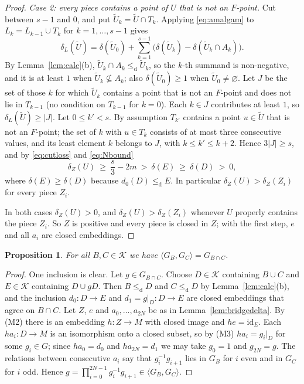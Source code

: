 \documentclass[11pt,a4paper]{article}
\newtheorem{proposition}[theorem]{Proposition}
\theoremstyle{definition}
\newcommand{\cle}{\leq_{\mathrm{d}}}
\newcommand{\id}{\mathrm{id}}
\newcommand{\K}{\mathcal{K}}
\begin{document}
\begin{proof}
\emph{Case 2: every piece contains a point of $U$ that is not an $F$-point.} Cut
between $s-1$ and $0$, and put $\widetilde U_k=\widetilde U\cap T_k$. Applying
\eqref{eq:amalgam} to $L_k=L_{k-1}\cup T_k$ for $k=1,\dots,s-1$ gives
\[
 \delta_L(\widetilde U)=\delta(\widetilde U_0)
 +\sum_{k=1}^{s-1}\bigl(\delta(\widetilde U_k)-\delta(\widetilde U_k\cap A_k)\bigr).
\]
By Lemma~\ref{lem:calc}(b), $\widetilde U_k\cap A_k\cle\widetilde U_k$, so the
$k$-th summand is non-negative, and it is at least $1$ when
$\widetilde U_k\not\subseteq A_k$; also $\delta(\widetilde U_0)\ge 1$ when
$\widetilde U_0\ne\varnothing$. Let $J$ be the set of those $k$ for which
$\widetilde U_k$ contains a point that is not an $F$-point and does not lie in
$T_{k-1}$ (no condition on $T_{k-1}$ for $k=0$). Each $k\in J$ contributes at
least $1$, so $\delta_L(\widetilde U)\ge|J|$. Let $0\le k'<s$. By assumption
$T_{k'}$ contains a point $u\in\widetilde U$ that is not an $F$-point; the set
of $k$ with $u\in T_k$ consists of at most three consecutive values, and its
least element $k$ belongs to $J$, with $k\le k'\le k+2$. Hence $3|J|\ge s$, and
by \eqref{eq:cutloss} and \eqref{eq:Nbound}
\[
 \delta_Z(U)\ \ge\ \frac s3-2m\ >\ \delta(E)\ \ge\ \delta(D)\ >\ 0 ,
\]
where $\delta(E)\ge\delta(D)$ because $d_0(D)\cle E$. In particular
$\delta_Z(U)>\delta_Z(Z_i)$ for every piece $Z_i$.

In both cases $\delta_Z(U)>0$, and $\delta_Z(U)>\delta_Z(Z_i)$ whenever $U$
properly contains the piece $Z_i$. So $Z$ is positive and every piece is closed
in $Z$; with the first step, $e$ and all $a_i$ are closed embeddings.
\end{proof}

\begin{proposition}\label{prop:stabdelta}
For all $B,C\in\K$ we have $\langle G_B,G_C\rangle=G_{B\cap C}$.
\end{proposition}

\begin{proof}
One inclusion is clear. Let $g\in G_{B\cap C}$. Choose $D\in\K$ containing
$B\cup C$ and $E\in\K$ containing $D\cup gD$. Then $B\cle D$ and $C\cle D$ by
Lemma~\ref{lem:calc}(b), and the inclusion $d_0\colon D\to E$ and
$d_1=g|_D\colon D\to E$ are closed embeddings that agree on $B\cap C$. Let
$Z$, $e$ and $a_0,\dots,a_{2N}$ be as in Lemma~\ref{lem:bridgedelta}. By (M2)
there is an embedding $h\colon Z\to M$ with closed image and $he=\id_E$. Each
$ha_i\colon D\to M$ is an isomorphism onto a closed subset, so by (M3)
$ha_i=g_i|_D$ for some $g_i\in G$; since $ha_0=d_0$ and $ha_{2N}=d_1$ we may take
$g_0=1$ and $g_{2N}=g$. The relations between consecutive $a_i$ say that
$g_i^{-1}g_{i+1}$ lies in $G_B$ for $i$ even and in $G_C$ for $i$ odd. Hence
$g=\prod_{i=0}^{2N-1}g_i^{-1}g_{i+1}\in\langle G_B,G_C\rangle$.
\end{proof}
\end{document}
